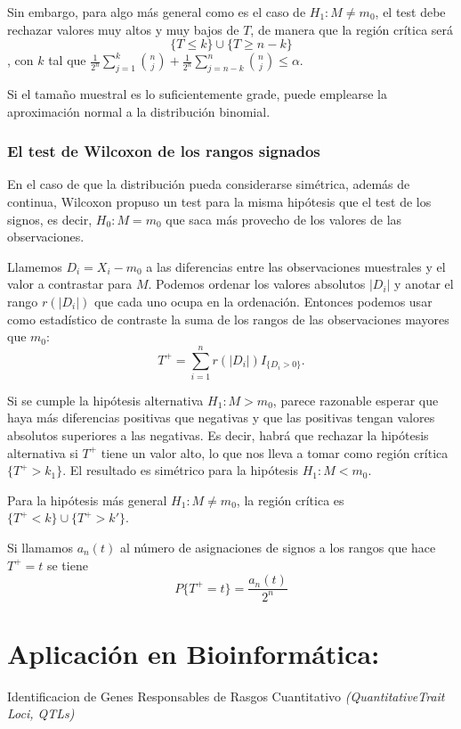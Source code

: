 \documentclass[a4paper,12pt]{article}
\begin{document}
Sin embargo, para algo más general como es el caso de $H_1:M\neq m_0$, el test debe rechazar valores muy altos y muy bajos de $T$, de manera que la región crítica será $$\{T\leq k\}\cup \{T\geq n - k \}$$, con $k$ tal que $\frac{1}{2^n}\sum_{j=1}^{k} \binom{n}{j} + \frac{1}{2^n}\sum_{j=n-k}^{n} \binom{n}{j} \leq \alpha$.

Si el tamaño muestral es lo suficientemente grade, puede emplearse la aproximación normal a la distribución binomial.

\subsubsection{El test de Wilcoxon de los rangos signados}
En el caso de que la distribución pueda considerarse simétrica, además de continua, Wilcoxon propuso un test para la misma hipótesis que el test de los signos, es decir, $H_0:M =m_0$ que saca más provecho de los valores de las observaciones.

Llamemos $D_i=X_i - m_0$ a las diferencias entre las observaciones muestrales y el valor a contrastar para $M$. Podemos ordenar los valores absolutos $|D_i|$ y anotar el rango $r(|D_i|)$ que cada uno ocupa en la ordenación.  Entonces podemos usar como estadístico de contraste la suma de los rangos de las observaciones mayores que $m_0$:
$$T^+ = \sum_{i =1}^{n} r(|D_i|)I_{\{D_i>0\}}.$$

Si se cumple la hipótesis alternativa $H_1:M>m_0$, parece razonable esperar que haya más diferencias positivas que negativas y que las positivas tengan valores absolutos superiores a las negativas. Es decir, habrá que rechazar la hipótesis alternativa si $T^+$ tiene un valor alto, lo que nos lleva a tomar como región crítica $\{T^+ > k_1\}$. El resultado es simétrico para la hipótesis $H_1:M<m_0$.

Para la hipótesis más general $H_1: M \neq m_0$, la región crítica es $\{ T^+<k\}\cup\{T^+ >k'\}.$

Si llamamos $a_n(t)$ al número de asignaciones de signos a los rangos que hace $T^+=t$ se tiene $$P\{T^+ = t\}=\frac{a_n(t)}{2^n}$$ 





\section{Aplicación en Bioinformática:}
\large{Identificacion de Genes Responsables de Rasgos Cuantitativo \textit{(QuantitativeTrait Loci, QTLs)}}
\normalsize{}
\end{document}
